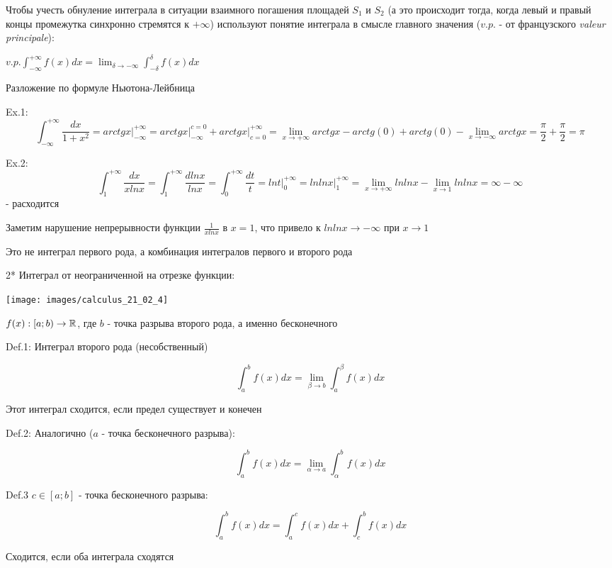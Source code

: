 \documentclass[12pt]{article}
\begin{document}
    Чтобы учесть обнуление интеграла в ситуации взаимного погашения площадей $S_1$ и $S_2$
    (а это происходит тогда, когда левый и правый концы промежутка синхронно стремятся к $+\infty$)
    используют понятие интеграла в смысле главного значения ($v.p.$ - от французского \textit{valeur principale}):

    $\displaystyle v.p. \int^{+\infty}_{-\infty} f(x) dx = \lim_{\delta \to -\infty} \int^{\delta}_{-\delta} f(x) dx$

    Разложение по формуле Ньютона-Лейбница

    Ex.1: \[\int^{+\infty}_{-\infty} \frac{dx}{1 + x^2} = arctg x \Big|^{+\infty}_{-\infty} = arctg x \Big|^{c = 0}_{-\infty} + arctg x \Big|^{+\infty}_{c = 0} =
    \lim_{x \to +\infty} arctgx - arctg(0) + arctg(0) - \lim_{x \to -\infty} arctgx = \frac{\pi}{2} + \frac{\pi}{2} = \pi\]

    Ex.2: \[\int^{+\infty}_{1} \frac{dx}{xlnx} = \int^{+\infty}_{1} \frac{dlnx}{lnx} = \int^{+\infty}_{0} \frac{dt}{t}
     = lnt \Big|^{+\infty}_{0} = ln ln x \Big|^{+\infty}_{1} = \lim_{x \to +\infty} ln ln x - \lim_{x \to 1} ln ln x = \infty - \infty\] - расходится

    Заметим нарушение непрерывности функции $\frac{1}{xlnx}$ в $x = 1$, что привело к $ln lnx \to -\infty$ при $x \to 1$

    Это не интеграл первого рода, а комбинация интегралов первого и второго рода

    2* Интеграл от неограниченной на отрезке функции:

    \texttt{[image: images/calculus\_21\_02\_4]}

    $f(x) : [a; b) \to \mathbb{R}$, где $b$ - точка разрыва второго рода, а именно бесконечного

    Def.1: Интеграл второго рода (несобственный)

    \[\int^{b}_{a} f(x) dx = \lim_{\beta \to b} \int^{\beta}_{a} f(x) dx\]

    Этот интеграл сходится, если предел существует и конечен

    Def.2: Аналогично ($a$ - точка бесконечного разрыва):

    \[\int^{b}_{a} f(x) dx = \lim_{\alpha \to a} \int^{b}_{\alpha} f(x) dx\]

    Def.3 $c \in [a;b]$ - точка бесконечного разрыва:

    \[\int^{b}_{a} f(x) dx = \int^{c}_{a} f(x) dx + \int^{b}_{c} f(x) dx\]

    Сходится, если оба интеграла сходятся
\end{document}
